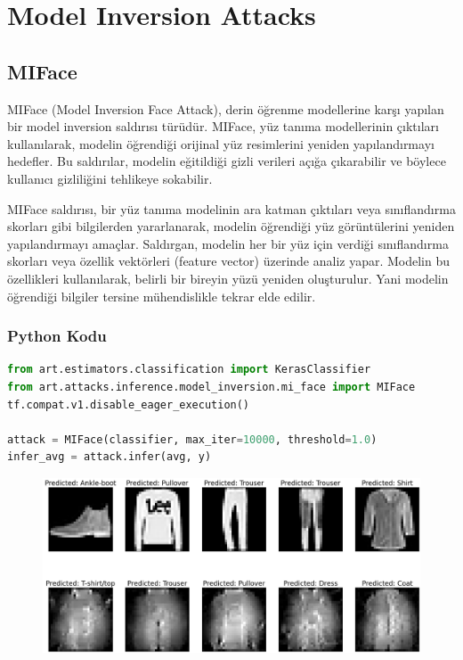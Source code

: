 \section{Model Inversion Attacks}

\subsection{MIFace}

MIFace (Model Inversion Face Attack), derin öğrenme modellerine karşı yapılan bir model inversion saldırısı türüdür. MIFace, yüz tanıma modellerinin çıktıları kullanılarak, modelin öğrendiği orijinal yüz resimlerini yeniden yapılandırmayı hedefler. Bu saldırılar, modelin eğitildiği gizli verileri açığa çıkarabilir ve böylece kullanıcı gizliliğini tehlikeye sokabilir.

MIFace saldırısı, bir yüz tanıma modelinin ara katman çıktıları veya sınıflandırma skorları gibi bilgilerden yararlanarak, modelin öğrendiği yüz görüntülerini yeniden yapılandırmayı amaçlar. Saldırgan, modelin her bir yüz için verdiği sınıflandırma skorları veya özellik vektörleri (feature vector) üzerinde analiz yapar. Modelin bu özellikleri kullanılarak, belirli bir bireyin yüzü yeniden oluşturulur. Yani modelin öğrendiği bilgiler tersine mühendislikle tekrar elde edilir.

\subsubsection{Python Kodu}

\begin{lstlisting}[language=Python]
from art.estimators.classification import KerasClassifier
from art.attacks.inference.model_inversion.mi_face import MIFace
tf.compat.v1.disable_eager_execution()

attack = MIFace(classifier, max_iter=10000, threshold=1.0)
infer_avg = attack.infer(avg, y)
\end{lstlisting}

\begin{figure}[h]
    \centering
    \includegraphics[width=1\textwidth]{images/miface_results.png}
    \caption{}
\end{figure}

\newpage